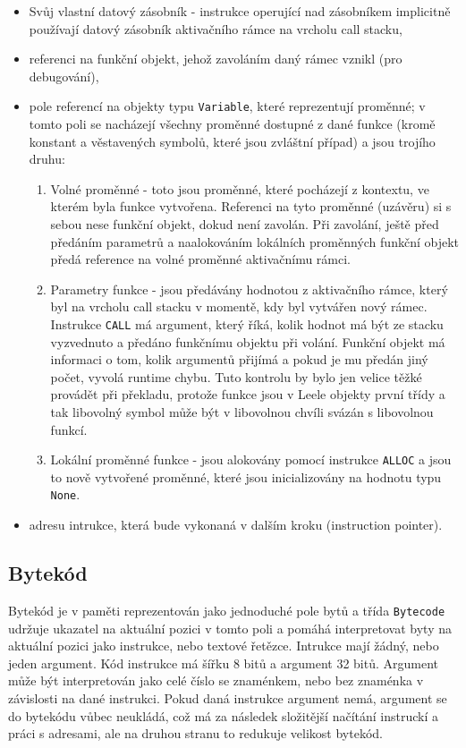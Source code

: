 \documentclass[10pt,a4paper]{article}
\begin{document}
\begin{itemize}
\item Svůj vlastní datový zásobník - instrukce operující nad zásobníkem
      implicitně používají datový zásobník aktivačního rámce na vrcholu call stacku,
\item referenci na funkční objekt, jehož zavoláním daný rámec vznikl (pro debugování),
\item pole referencí na objekty typu \texttt{Variable}, které reprezentují
      proměnné; v tomto poli se nacházejí všechny proměnné dostupné z dané funkce
	 (kromě konstant a věstavených symbolů, které jsou zvláštní případ) a jsou trojího
	 druhu:
	 \begin{enumerate}
	 \item Volné proměnné - toto jsou proměnné, které pocházejí z kontextu, ve kterém
	       byla funkce vytvořena. Referenci na tyto proměnné (uzávěru) si s sebou nese
		  funkční objekt, dokud není zavolán. Při zavolání, ještě před předáním parametrů
		  a naalokováním lokálních proměnných funkční objekt předá reference na volné
		  proměnné aktivačnímu rámci.
	 \item Parametry funkce - jsou předávány hodnotou z aktivačního rámce, který
	       byl na vrcholu call stacku v momentě, kdy byl vytvářen nový rámec.
		  Instrukce \texttt{CALL} má argument, který říká, kolik hodnot má být ze
		  stacku vyzvednuto a předáno funkčnímu objektu při volání. Funkční objekt
		  má informaci o tom, kolik argumentů přijímá a pokud je mu předán jiný počet,
		  vyvolá runtime chybu. Tuto kontrolu by bylo jen velice těžké provádět při
		  překladu, protože funkce jsou v Leele objekty první třídy a tak libovolný
		  symbol může být v libovolnou chvíli svázán s libovolnou funkcí.
	 \item Lokální proměnné funkce - jsou alokovány pomocí instrukce \texttt{ALLOC} a
	       jsou to nově vytvořené proměnné, které jsou inicializovány na hodnotu typu
		  \texttt{None}.
	 \end{enumerate}
\item adresu intrukce, která bude vykonaná v dalším kroku (instruction pointer).
\end{itemize}

\subsection{Bytekód}

Bytekód je v paměti reprezentován jako jednoduché pole bytů a třída
\texttt{Bytecode} udržuje ukazatel na aktuální pozici v tomto poli a pomáhá
interpretovat byty na aktuální pozici jako instrukce, nebo textové řetězce.
Intrukce mají žádný, nebo jeden argument. Kód instrukce má šířku 8 bitů a
argument 32 bitů. Argument může být interpretován jako celé číslo se znaménkem,
nebo bez znaménka v závislosti na dané instrukci. Pokud daná instrukce
argument nemá, argument se do bytekódu vůbec neukládá, což má za
následek složitější načítání instruckí a práci s adresami, ale na
druhou stranu to redukuje velikost bytekód.
\end{document}
